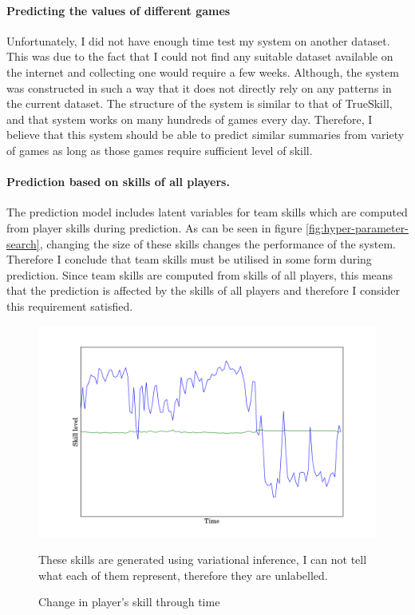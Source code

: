 \documentclass[12pt,a4paper]{book}
\newcommand\note[1]{\vspace*{-0.5\baselineskip}\caption*{#1}}
\begin{document}
\paragraph{Predicting the values of different games}
Unfortunately, I did not have enough time test my system on another dataset.
This was due to the fact that I could not find any suitable dataset available on the internet and collecting one would require a few weeks.
Although, the system was constructed in such a way that it does not directly rely on any patterns in the current dataset.
The structure of the system is similar to that of TrueSkill, and that system works on many hundreds of games every day.
Therefore, I believe that this system should be able to predict similar summaries from variety of games as long as those games require sufficient level of skill.

\paragraph{Prediction based on skills of all players.}
The prediction model includes latent variables for team skills which are computed from player skills during prediction.
As can be seen in figure \ref{fig:hyper-parameter-search}, changing the size of these skills changes the performance of the system.
Therefore I conclude that team skills must be utilised in some form during prediction.
Since team skills are computed from skills of all players, this means that the prediction is affected by the skills of all players and therefore I consider this requirement satisfied.

\begin{figure}[ht]
\centering
\includegraphics[scale=0.5]{player_skill}
\caption{Change in player's skill through time}
\note{These skills are generated using variational inference, I can not tell what each of them represent, therefore they are unlabelled.}
\label{fig:player-skill}
\end{figure}
\end{document}
